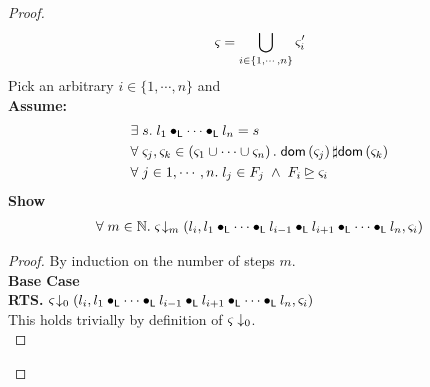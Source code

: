 \begin{lemma}[]
\begin{proof}
\begin{align}
	\varsigma_{} = \bigcup\limits_{i \in \{1, \cdots ,n\}} \varsigma_{i}' \label{LAW:Ass1}
\end{align}
Pick an arbitrary $i \in \{1, \cdots, n\}$ and\\
\textbf{Assume:}
%
\begin{align}
	& \exists\; s.\; l_1 \bullet_{\textsf{L}}  \cdots \bullet_{\textsf{L}} l_n = s \label{LAW:Ass2}\\
	& \forall\; \varsigma_{j}, \varsigma_{k} \in \left(\varsigma_{1} \cup \cdots \cup \varsigma_{n}\right).\; \textsf{dom}\left( \varsigma_{j} \right) \sharp \textsf{dom}\left( \varsigma_{k} \right) \label{LAW:Ass3}\\
	&\forall\; j \in 1, \cdots, n.\; l_j \in F_j  \;\land\; F_i \unrhd \varsigma_{i} \label{LAW:Ass4}
\end{align}
%
\noindent\textbf{Show}
\begin{align}
	\forall\; m \in \mathbb{N}.\; \varsigma_{} \!\downarrow_{m} \left(l_i, l_1 \bullet_{\textsf{L}} \cdots \bullet_{\textsf{L}} l_{i-1} \bullet_{\textsf{L}} l_{i+1} \bullet_{\textsf{L}} \cdots \bullet_{\textsf{L}} l_n, \varsigma_{i}\right)
\end{align}
%
\begin{proof}
By induction on the number of steps $m$.\\

\noindent\textbf{Base Case}\\
\textbf{RTS. } $\varsigma_{} \!\downarrow_{0} \left(l_i, l_1 \bullet_{\textsf{L}} \cdots \bullet_{\textsf{L}} l_{i-1} \bullet_{\textsf{L}} l_{i+1} \bullet_{\textsf{L}} \cdots \bullet_{\textsf{L}} l_n, \varsigma_{i}\right)$\\
This holds trivially by definition of $\varsigma_{}\downarrow_{0}$.\\


\end{proof}
\end{proof}
\end{lemma}
